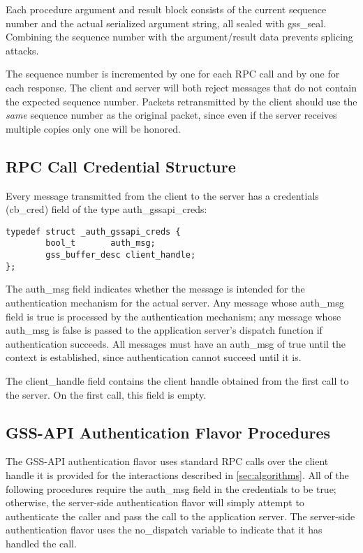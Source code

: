 Each procedure argument and result block consists of the current
sequence number and the actual serialized argument string, all sealed
with gss_seal.  Combining the sequence number with the argument/result
data prevents splicing attacks.

The sequence number is incremented by one for each RPC call and by one
for each response.  The client and server will both reject messages
that do not contain the expected sequence number.  Packets
retransmitted by the client should use the {\it same} sequence number
as the original packet, since even if the server receives multiple
copies only one will be honored.

\subsection{RPC Call Credential Structure}

Every message transmitted from the client to the server has a
credentials (cb_cred) field of the type auth_gssapi_creds:

\begin{verbatim}
typedef struct _auth_gssapi_creds {
        bool_t       auth_msg;
        gss_buffer_desc client_handle;
};
\end{verbatim}

The auth_msg field indicates whether the message is intended for the
authentication mechanism for the actual server.  Any message whose
auth_msg field is true is processed by the authentication mechanism;
any message whose auth_msg is false is passed to the application
server's dispatch function if authentication succeeds.  All messages
must have an auth_msg of true until the context is established, since
authentication cannot succeed until it is.

The client_handle field contains the client handle obtained from the
first call to the server.  On the first call, this field is empty.

\subsection{GSS-API Authentication Flavor Procedures}

The GSS-API authentication flavor uses standard RPC calls over the
client handle it is provided for the interactions described in
\ref{sec:algorithms}.  All of the following procedures require the
auth_msg field in the credentials to be true; otherwise, the
server-side authentication flavor will simply attempt to authenticate
the caller and pass the call to the application server.  The
server-side authentication flavor uses the no_dispatch variable to
indicate that it has handled the call.

